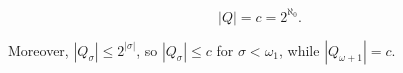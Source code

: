 $$|Q| = c = 2^{\aleph_0}.$$

Moreover, $|Q_\sigma| \leq 2^{|\sigma|}$, so $|Q_\sigma| \leq c$ for $\sigma < \omega_1$, while $|Q_{\omega+1}| = c$.
